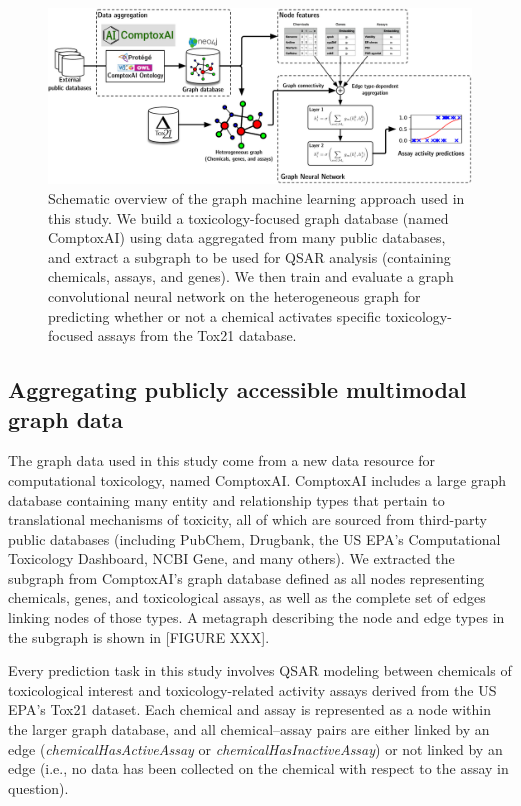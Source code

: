 \documentclass{ws-procs11x85}
\begin{document}
\begin{figure}
   \centering
   \includegraphics[width=\textwidth]{figures/figure1.pdf}
   \caption{Schematic overview of the graph machine learning approach used in this study. We build a toxicology-focused graph database (named ComptoxAI) using data aggregated from many public databases, and extract a subgraph to be used for QSAR analysis (containing chemicals, assays, and genes). We then train and evaluate a graph convolutional neural network on the heterogeneous graph for predicting whether or not a chemical activates specific toxicology-focused assays from the Tox21 database.}
\end{figure}

\subsection{Aggregating publicly accessible multimodal graph data}
The graph data used in this study come from a new data resource for computational toxicology, named ComptoxAI.
ComptoxAI includes a large graph database containing many entity and relationship types that pertain to translational mechanisms of toxicity, all of which are sourced from third-party public databases (including PubChem, Drugbank, the US EPA's Computational Toxicology Dashboard, NCBI Gene, and many others).
We extracted the subgraph from ComptoxAI's graph database defined as all nodes representing chemicals, genes, and toxicological assays, as well as the complete set of edges linking nodes of those types.
A metagraph describing the node and edge types in the subgraph is shown in [FIGURE XXX].

Every prediction task in this study involves QSAR modeling between chemicals of toxicological interest and toxicology-related activity assays derived from the US EPA's Tox21 dataset.
Each chemical and assay is represented as a node within the larger graph database, and all chemical--assay pairs are either linked by an edge (\textit{chemicalHasActiveAssay} or \textit{chemicalHasInactiveAssay}) or not linked by an edge (i.e., no data has been collected on the chemical with respect to the assay in question). 
\end{document}
